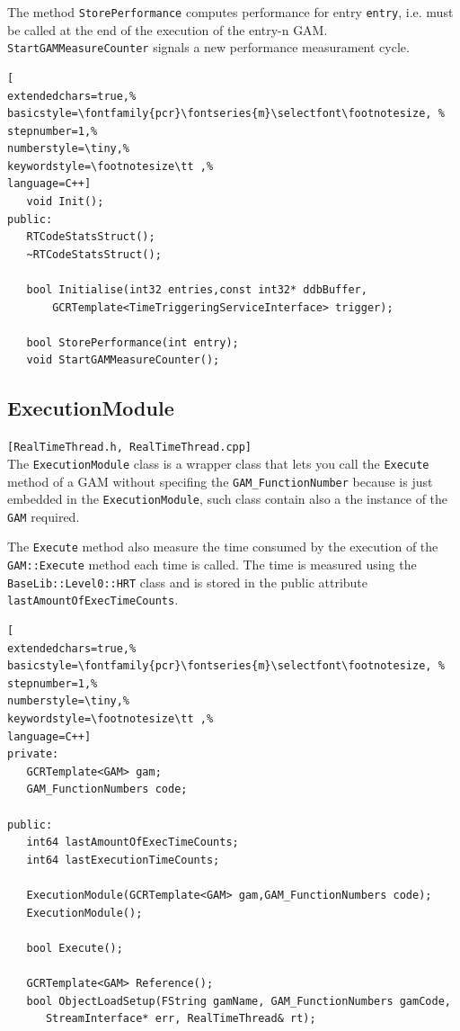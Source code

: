 The method \texttt{StorePerformance} computes performance for entry \texttt{entry}, i.e. must be called at the end of the execution of the entry-n GAM. \texttt{StartGAMMeasureCounter} signals a new performance measurament cycle.

\begin{lstlisting}[
extendedchars=true,%
basicstyle=\fontfamily{pcr}\fontseries{m}\selectfont\footnotesize, %
stepnumber=1,%
numberstyle=\tiny,%
keywordstyle=\footnotesize\tt ,%
language=C++]
   void Init();
public:
   RTCodeStatsStruct();
   ~RTCodeStatsStruct();

   bool Initialise(int32 entries,const int32* ddbBuffer,
       GCRTemplate<TimeTriggeringServiceInterface> trigger);

   bool StorePerformance(int entry);
   void StartGAMMeasureCounter();
\end{lstlisting}



\subsection{ExecutionModule}
\texttt{[RealTimeThread.h, RealTimeThread.cpp]} \\
The \texttt{ExecutionModule} class is a wrapper class that lets you call the \texttt{Execute} method of a GAM without specifing the \texttt{GAM\_FunctionNumber} because is just embedded in the \texttt{ExecutionModule}, such class contain also a the instance of the \texttt{GAM} required.

The \texttt{Execute} method also measure the time consumed by the execution of the \texttt{GAM::Execute} method each time is called. The time is measured using the \texttt{BaseLib::Level0::HRT} class and is stored in the public attribute \texttt{lastAmountOfExecTimeCounts}.

\begin{lstlisting}[
extendedchars=true,%
basicstyle=\fontfamily{pcr}\fontseries{m}\selectfont\footnotesize, %
stepnumber=1,%
numberstyle=\tiny,%
keywordstyle=\footnotesize\tt ,%
language=C++]
private:
   GCRTemplate<GAM> gam;
   GAM_FunctionNumbers code;

public:
   int64 lastAmountOfExecTimeCounts;
   int64 lastExecutionTimeCounts;

   ExecutionModule(GCRTemplate<GAM> gam,GAM_FunctionNumbers code);
   ExecutionModule();

   bool Execute();

   GCRTemplate<GAM> Reference();
   bool ObjectLoadSetup(FString gamName, GAM_FunctionNumbers gamCode,
      StreamInterface* err, RealTimeThread& rt);
\end{lstlisting}



